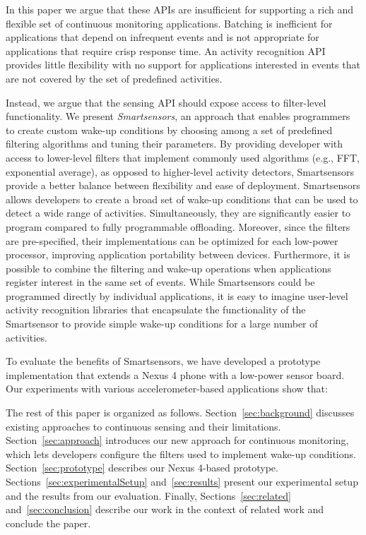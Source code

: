 In this paper we argue that these APIs are insufficient for supporting
a rich and flexible set of continuous monitoring applications.
Batching is inefficient for applications that depend on infrequent
events and is not appropriate for applications that require crisp
response time.  An activity recognition API provides little
flexibility with no support for applications interested in events that
are not covered by the set of predefined activities.  

Instead, we argue that the sensing API should expose access to
filter-level functionality.  We present {\em Smartsensors}, an
approach that enables programmers to create custom wake-up conditions
by choosing among a set of predefined filtering algorithms and tuning
their parameters.  By providing developer with access to lower-level
filters that implement commonly used algorithms (e.g., FFT,
exponential average), as opposed to higher-level activity detectors,
Smartsensors provide a better balance between flexibility and ease of
deployment.  Smartsensors allows developers to create a broad set of
wake-up conditions that can be used to detect a wide range of
activities.  Simultaneously, they are significantly easier to program
compared to fully programmable offloading.  Moreover, since the
filters are pre-specified, their implementations can be optimized for
each low-power processor, improving application portability between
devices.  Furthermore, it is possible to combine the filtering and
wake-up operations when applications register interest in the same set
of events.  While Smartsensors could be programmed directly by
individual applications, it is easy to imagine user-level activity
recognition libraries that encapsulate the functionality of the
Smartsensor to provide simple wake-up conditions for a large number of
activities.

To evaluate the benefits of Smartsensors, we have developed a
prototype implementation that extends a Nexus 4 phone with a low-power
sensor board.  Our experiments with various accelerometer-based
applications show that: 

The rest of this paper is organized as follows.
Section~\ref{sec:background} discusses existing approaches to
continuous sensing and their limitations.  Section~\ref{sec:approach}
introduces our new approach for continuous monitoring, which lets
developers configure the filters used to implement wake-up conditions.
Section~\ref{sec:prototype} describes our Nexus 4-based prototype.
Sections~\ref{sec:experimentalSetup} and~\ref{sec:results} present our
experimental setup and the results from our evaluation.  Finally,
Sections~\ref{sec:related} and~\ref{sec:conclusion} describe our work
in the context of related work and conclude the paper.

